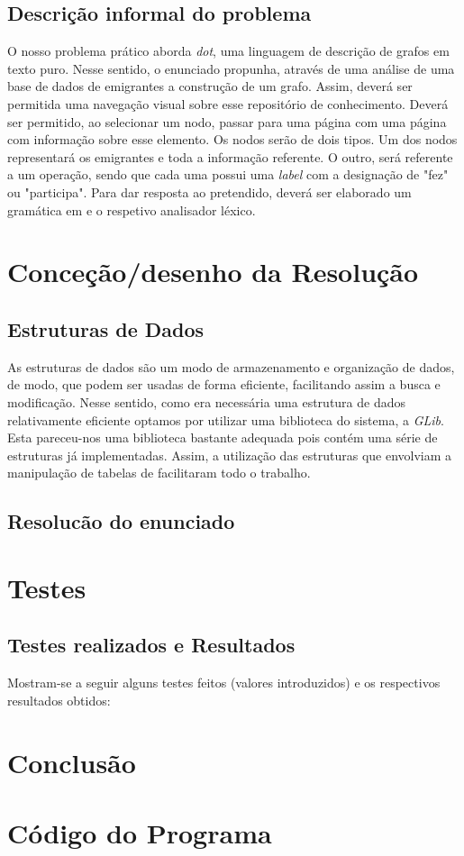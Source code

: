 \documentclass{report}
\begin{document}
\section{Descrição informal do problema}
O nosso problema prático aborda \textit{dot}, uma linguagem de descrição de grafos em texto puro. Nesse sentido, o enunciado propunha, através de uma análise de uma base de dados de emigrantes a construção de um grafo. Assim, deverá ser permitida uma navegação visual sobre esse repositório de conhecimento. Deverá ser permitido, ao selecionar um nodo, passar para uma página com uma página com informação sobre esse elemento. Os nodos serão de dois tipos. Um dos nodos representará os emigrantes e toda a informação referente. O outro, será referente a um operação, sendo que cada uma possui uma \textit{label} com a designação de "fez" ou "participa". Para dar resposta ao pretendido, deverá ser elaborado um gramática em  e o respetivo analisador léxico.


\chapter{Conceção/desenho da Resolução}
\section{Estruturas de Dados}
As estruturas de dados são um modo de armazenamento e organização de dados, de modo, que podem ser usadas de forma eficiente, facilitando assim a busca e modificação. Nesse sentido, como era necessária uma estrutura de dados relativamente eficiente optamos por utilizar uma biblioteca do sistema, a \textit{GLib}. Esta pareceu-nos uma biblioteca bastante adequada pois contém uma série de estruturas já implementadas. Assim, a utilização das estruturas que envolviam a manipulação de tabelas de  facilitaram todo o trabalho.

\section{Resolucão do enunciado}

\chapter{Testes}
\section{Testes realizados e Resultados}
Mostram-se a seguir alguns testes feitos (valores introduzidos) e
os respectivos resultados obtidos:


\chapter{Conclusão} \label{concl}

\appendix
\chapter{Código do Programa}
\end{document}
